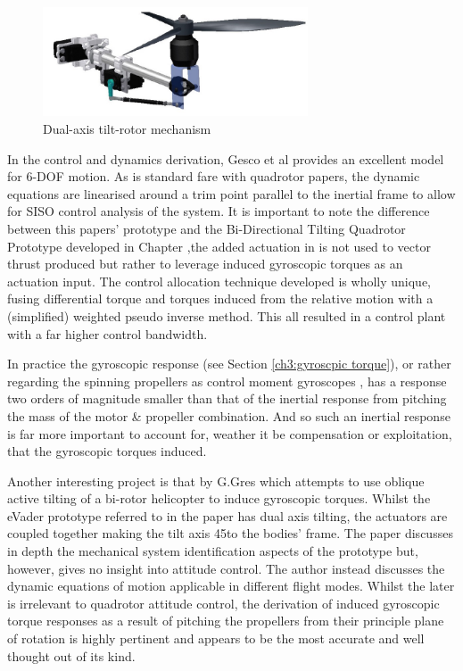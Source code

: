 \begin{figure}[hbtp]
\centering
\includegraphics[width=0.7\textwidth]{figs/gasco-mech}
\caption{Dual-axis tilt-rotor mechanism}
\label{fig:tiltrotor-gasco}
\end{figure}
\par
In the control and dynamics derivation, Gesco et al provides an excellent model for 6-DOF motion. As is standard fare with quadrotor papers, the dynamic equations are linearised around a trim point parallel to the inertial frame to allow for SISO control analysis of the system. It is important to note the difference between this papers' prototype and the Bi-Directional Tilting Quadrotor Prototype developed in Chapter \cite{ch:design} ,the added actuation in \cite{tiltgasco} is not used to vector thrust produced but rather to leverage induced gyroscopic torques as an actuation input. The control allocation technique developed is wholly unique, fusing differential torque and torques induced from the relative motion with a (simplified) weighted pseudo inverse method. This all resulted in a control plant with a far higher control bandwidth. 
\par
In practice the gyroscopic response (see Section \ref{ch3:gyroscpic torque}), or rather regarding the spinning propellers as control moment gyroscopes \cite{cmg}, has a response two orders of magnitude smaller than that of the inertial response from pitching the mass of the motor \& propeller combination. And so such an inertial response is far more important to account for, weather it be compensation or exploitation, that the gyroscopic torques induced.
\par



Another interesting project is that by G.Gres \cite{gres2007} which attempts to use oblique active tilting of a bi-rotor helicopter to induce gyroscopic torques. Whilst the eVader prototype referred to in the paper has dual axis tilting, the actuators are coupled together making the tilt axis 45\textdegree to the bodies' frame. The paper discusses in depth the mechanical system identification aspects of the prototype but, however, gives no insight into attitude control. The author instead discusses the dynamic equations of motion applicable in different flight modes. Whilst the later is irrelevant to quadrotor attitude control, the derivation of induced gyroscopic torque responses as a result of pitching the propellers from their principle plane of rotation is highly pertinent and appears to be the most accurate and well thought out of its kind.

